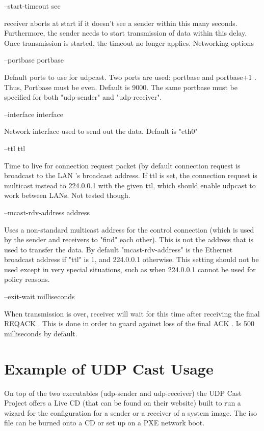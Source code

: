 --start-timeout sec

    receiver aborts at start if it doesn't see a sender within this many
seconds. Furthermore, the sender needs to start transmission of data within
this delay. Once transmission is started, the timeout no longer applies. 
Networking options

--portbase portbase

    Default ports to use for udpcast. Two ports are used: portbase and
portbase+1 . Thus, Portbase must be even. Default is 9000. The same
portbase must be specified for both "udp-sender" and "udp-receiver". 

--interface interface

    Network interface used to send out the data. Default is "eth0" 

--ttl ttl

    Time to live for connection request packet (by default connection
request is broadcast to the LAN 's broadcast address. If ttl is set, the
connection request is multicast instead to 224.0.0.1 with the given ttl,
which should enable udpcast to work between LANs. Not tested though. 

--mcast-rdv-address address

    Uses a non-standard multicast address for the control connection (which
is used by the sender and receivers to "find" each other). This is not the
address that is used to transfer the data. By default "mcast-rdv-address"
is the Ethernet broadcast address if "ttl" is 1, and 224.0.0.1 otherwise.
This setting should not be used except in very special situations, such as
when 224.0.0.1 cannot be used for policy reasons. 

--exit-wait milliseconds

    When transmission is over, receiver will wait for this time after
receiving the final REQACK . This is done in order to guard against loss of
the final ACK . Is 500 milliseconds by default.


\section{Example of UDP Cast Usage}

On top of the two executables (udp-sender and udp-receiver) the UDP Cast
Project offers a Live CD (that can be found on their website) built to run
a wizard for the configuration for a sender or a receiver of a system
image. The iso file can be burned onto a CD or set up on a PXE network
boot.

